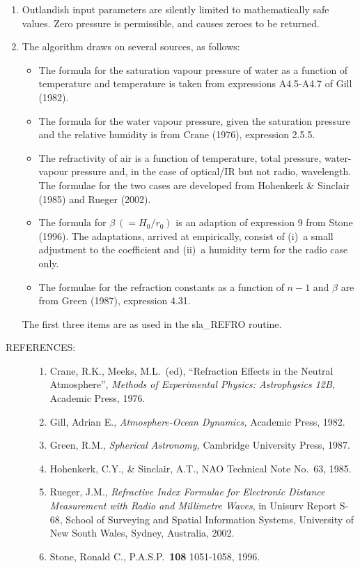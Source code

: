 \documentclass[11pt,twoside,nolof]{starlink}
\providecommand{\arcsec}[2] {\arcseci{#1}$\hspace{-0.4em}.#2$}
\providecommand{\arcseci}[1] {$#1\hspace{-0.05em}$\raisebox{-0.5ex}
                         {$^{'\hspace{-0.1em}'}$}}
\renewcommand{\refs}[1]
 {  \begin{description}
     \item[REFERENCES:]
         #1
   \end{description}
}
\begin{document}
{\begin{enumerate}
        The results from the much slower but more accurate sla\_REFCO
        routine have not been included in the tabulation as they are
        identical to those in the sla\_REFRO column to the \arcsec{0}{01}
        resolution used.
  \item Outlandish input parameters are silently limited
        to mathematically safe values.  Zero pressure is permissible,
        and causes zeroes to be returned.
  \item The algorithm draws on several sources, as follows:
        \begin{itemize}
        \item The formula for the saturation vapour pressure of water as
              a function of temperature and temperature is taken from
              expressions A4.5-A4.7 of Gill (1982).
        \item The formula for the water vapour pressure, given the
              saturation pressure and the relative humidity is from
              Crane (1976), expression 2.5.5.
        \item The refractivity of air is a function of temperature,
              total pressure, water-vapour pressure and, in the case
              of optical/IR but not radio, wavelength.  The formulae
              for the two cases are developed from Hohenkerk \& Sinclair
              (1985) and Rueger (2002).
        \item The formula for $\beta~(=H_0/r_0)$ is
              an adaption of expression 9 from Stone (1996).  The
              adaptations, arrived at empirically, consist of (i)~a
              small adjustment to the coefficient and (ii)~a humidity
              term for the radio case only.
        \item The formulae for the refraction constants as a function of
              $n-1$ and $\beta$ are from Green (1987), expression 4.31.
        \end{itemize}
        The first three items are as used in the sla\_REFRO routine.
 \end{enumerate}
}
\refs
{
 \begin{enumerate}
  \item Crane, R.K., Meeks, M.L.\ (ed), ``Refraction Effects in
        the Neutral Atmosphere'',
        \textit{Methods of Experimental Physics: Astrophysics 12B,}\/
        Academic Press, 1976.
  \item Gill, Adrian E., \textit{Atmosphere-Ocean Dynamics,}\/
        Academic Press, 1982.
  \item Green, R.M., \textit{Spherical Astronomy,}\/ Cambridge
        University Press, 1987.
  \item Hohenkerk, C.Y., \& Sinclair, A.T., NAO Technical Note
        No.~63, 1985.
  \item Rueger, J.M., \textit{Refractive Index Formulae for
        Electronic Distance Measurement with Radio and Millimetre
        Waves}, in Unisurv Report S-68, School of Surveying
        and Spatial Information Systems, University of New South
        Wales, Sydney, Australia, 2002.
  \item Stone, Ronald C., P.A.S.P.~\textbf{108} 1051-1058, 1996.
 \end{enumerate}
}
\end{document}
